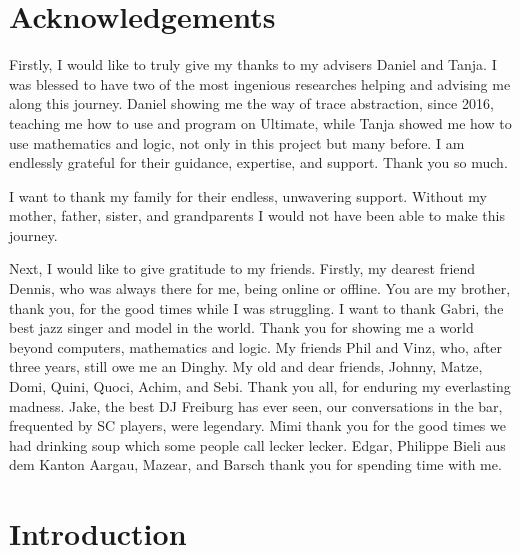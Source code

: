 \documentclass[11pt,
a4paper,
parskip=half, %
BCOR=10mm, %
ngerman, english
]{scrbook}
\begin{document}
	\setlength{\abovedisplayskip}{0.25cm}
	\setlength{\belowdisplayskip}{0.25cm}
	\setlength{\abovedisplayshortskip}{0.25cm}
	\setlength{\belowdisplayshortskip}{0.25cm}
	 \raggedbottom
\newcommand{\HorizontalLine}{\rule{\textwidth}{0.4mm}}


\pagebreak

\frontmatter

\pagebreak



\chapter{Acknowledgements}
Firstly, I would like to truly give my thanks to my advisers Daniel and Tanja. I was blessed to have two of the most ingenious researches helping and advising me along this journey. Daniel showing me the way of trace abstraction, since 2016, teaching me how to use and program on Ultimate, while Tanja showed me how to use mathematics and logic, not only in this project but many before. I am endlessly grateful for their guidance, expertise, and support. Thank you so much. \par 
I want to thank my family for their endless, unwavering support. Without my mother, father, sister, and grandparents I would not have been able to make this journey. \par 
Next, I would like to give gratitude to my friends. Firstly, my dearest friend Dennis, who was always there for me, being online or offline. You are my brother, thank you, for the good times while I was struggling. I want to thank Gabri, the best jazz singer and model in the world. Thank you for showing me a world beyond computers, mathematics and logic. My friends Phil and Vinz, who, after three years, still owe me an Dinghy. My old and dear friends, Johnny, Matze, Domi, Quini, Quoci, Achim, and Sebi. Thank you all, for enduring my everlasting madness. Jake, the best DJ Freiburg has ever seen, our conversations in the bar, frequented by SC players, were legendary. Mimi thank you for the good times we had drinking soup which some people call lecker lecker. Edgar, Philippe Bieli aus dem Kanton Aargau, Mazear, and Barsch thank you for spending time with me.

\tableofcontents
\pagebreak

\mainmatter
\chapter{Introduction}
\label{intro}

\end{document}
